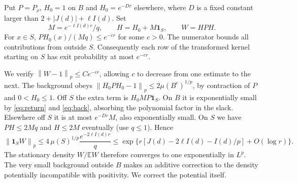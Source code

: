 \documentclass[11pt]{article}
\newcommand{\E}{\mathbb E}
\newcommand{\one}{\mathbf 1}
\newcommand{\norm}[1]{\left\|#1\right\|}
\begin{document}
Put $P=P_\rho$, $H_0=1$ on $B$ and $H_0=e^{-Dr}$ elsewhere, where $D$ is a fixed constant larger than $2+|J(d)|+\ell I(d)$. Set
\[
 M=e^{-\ell I(d)r}/q,\qquad H=H_0+M\one_S,\qquad W=H P H.
\]
For $x\in S$, $P H_0(x)/(Mq)\le e^{-c r}$ for some $c>0$. The numerator bounds all contributions from outside $S$. Consequently each row of the transformed kernel starting on $S$ has exit probability at most $e^{-c r}$.

We verify $\norm{W-1}_p\le C e^{-c r}$, allowing $c$ to decrease from one estimate to the next. The background obeys $\norm{H_0 P H_0-1}_p\le2\mu(B^c)^{1/p}$, by contraction of $P$ and $0<H_0\le1$. Off $S$ the extra term is $H_0 M P\one_S$. On $B$ it is exponentially small by \eqref{eq:return} and \eqref{eq:back}, absorbing the polynomial factor in the slack. Elsewhere off $S$ it is at most $e^{-Dr}M$, also exponentially small. On $S$ we have $PH\le 2Mq$ and $H\le2M$ eventually (use $q\le1$). Hence
\[
 \norm{\one_S W}_p
 \le 4\,\mu(S)^{1/p}\frac{e^{-2\ell I(d)r}}{q}
 \le \exp\{r[J(d)-2\ell I(d)-I(d)/p]+O(\log r)\}.
\]
The stationary density $W/\E W$ therefore converges to one exponentially in $L^p$. The very small background outside $B$ makes an additive correction to the density potentially incompatible with positivity. We correct the potential itself.
\end{document}
